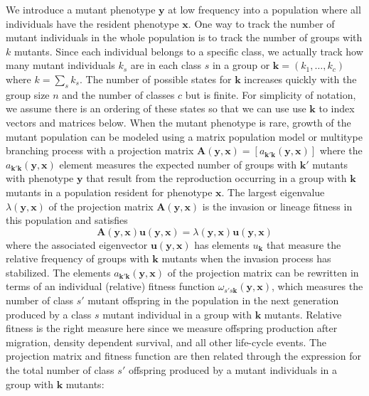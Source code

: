 \documentclass[11pt]{article}
\renewcommand{\vec}[1]{\symbf{#1}}
\newcommand{\eig}{\lambda}
\newcommand{\numc}{c}
\begin{document}
We introduce a mutant phenotype $\vec{y}$ at low frequency into a population where all individuals have the resident phenotype $\vec{x}$. One way to track the number of mutant individuals in the whole population is to track the number of groups with $k$ mutants. Since each individual belongs to a specific class, we actually track how many mutant individuals $k_{s}$ are in each class $s$ in a group or $\vec{k} = (k_{1},\ldots,k_{\numc})$ where $k = \sum_{s} k_{s}$. The number of possible states for $\vec{k}$ increases quickly with the group size $n$ and the number of classes $\numc$ but is finite. For simplicity of notation, we assume there is an ordering of these states so that we can use use $\vec{k}$ to index vectors and matrices below. When the mutant phenotype is rare, growth of the mutant population can be modeled using a matrix population model \cite{Caswell:2006} or multitype branching process \cite{Kimmel:Axelrod:2015} with a projection matrix $\vec{A}(\vec{y}, \vec{x}) = [a_{\vec{k}'\vec{k}}(\vec{y}, \vec{x})]$ where the $a_{\vec{k}'\vec{k}}(\vec{y}, \vec{x})$ element measures the expected number of groups with $\vec{k}'$ mutants with phenotype $\vec{y}$ that result from the reproduction occurring in a group with $\vec{k}$ mutants in a population resident for phenotype $\vec{x}$. The largest eigenvalue $\eig(\vec{y}, \vec{x})$ of the projection matrix $\vec{A}(\vec{y}, \vec{x})$ is the invasion or lineage fitness in this population and satisfies
\begin{equation}
  \label{eq:Au:eigu}
  \vec{A}(\vec{y}, \vec{x}) \vec{u}(\vec{y}, \vec{x}) = \eig(\vec{y}, \vec{x}) \vec{u}(\vec{y}, \vec{x})
\end{equation}
where the associated eigenvector $\vec{u}(\vec{y}, \vec{x})$ has elements $u_{\vec{k}}$ that measure the relative frequency of groups with $\vec{k}$ mutants when the invasion process has stabilized. The elements $a_{\vec{k}'\vec{k}}(\vec{y}, \vec{x})$ of the projection matrix can be rewritten in terms of an individual (relative) fitness function $\omega_{s'\!s\vec{k}}(\vec{y}, \vec{x})$, which measures the number of class $s'$ mutant offspring in the population in the next generation produced by a class $s$ mutant individual in a group with $\vec{k}$ mutants. Relative fitness is the right measure here since we measure offspring production after migration, density dependent survival, and all other life-cycle events. The projection matrix and fitness function are then related through the expression for the total number of class $s'$ offspring produced by a mutant individuals in a group with $\vec{k}$ mutants:
\end{document}
